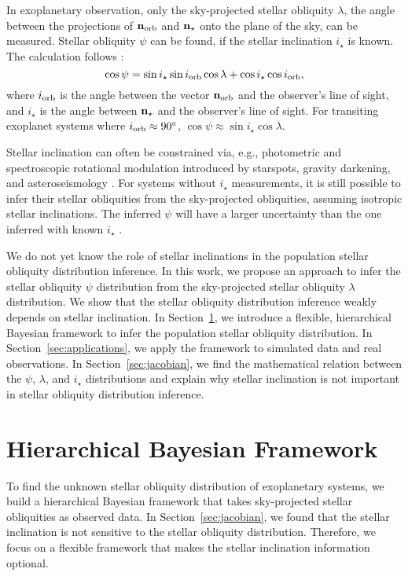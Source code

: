 \documentclass[twocolumn,times]{aastex631}
\begin{document}
In exoplanetary observation, only the sky-projected stellar obliquity $\lambda$, the angle between the projections of $\bf{n}_{\rm orb}$ and $\bf{n}_{\star}$ onto the plane of the sky, can be measured. Stellar obliquity $\psi$ can be found, if the stellar inclination $i_\star$ is known. The calculation follows \citep[e.g.,][]{Fabrycky09}:
\begin{equation}\label{eqn:psi}
    \cos{\psi} = \sin{i_\star}\sin{i_{\rm orb}}\cos{\lambda} + \cos{i_\star}\cos{i_{\rm orb}},
\end{equation}
where $i_{\rm orb}$ is the angle between the vector $\bf{n}_{\rm orb}$ and the observer's line of sight, and $i_\star$ is the angle between $\bf{n}_{\star}$ and the observer's line of sight.
For transiting exoplanet systems where $i_{\rm orb} \approx 90\mbox{$^\circ$}$, $\cos{\psi} \approx \sin{i_\star}\cos{\lambda}$.

Stellar inclination can often be constrained via, e.g., photometric and spectroscopic rotational modulation introduced by starspots, gravity darkening, and asteroseismology \citep[see][and references therein]{Albrecht22}.
For systems without $i_\star$ measurements, it is still possible to infer their stellar obliquities from the sky-projected obliquities, assuming isotropic stellar inclinations. The inferred $\psi$ will have a larger uncertainty than the one inferred with known $i_\star$ \citep{Fabrycky09}.

We do not yet know the role of stellar inclinations in the population stellar obliquity distribution inference. 
In this work, we propose an approach to infer the stellar obliquity $\psi$ distribution from the sky-projected stellar obliquity $\lambda$ distribution. We show that the stellar obliquity distribution inference weakly depends on stellar inclination.
In Section~\ref{sec:hbm}, we introduce a flexible, hierarchical Bayesian framework to infer the population stellar obliquity distribution.
In Section~\ref{sec:applications}, we apply the framework to simulated data and real observations.
In Section~\ref{sec:jacobian}, we find the mathematical relation between the $\psi$, $\lambda$, and $i_\star$ distributions and explain why stellar inclination is not important in stellar obliquity distribution inference.

\section{Hierarchical Bayesian Framework}\label{sec:hbm}

To find the unknown stellar obliquity distribution of exoplanetary systems, we build a hierarchical Bayesian framework that takes sky-projected stellar obliquities as observed data. In Section~\ref{sec:jacobian}, we found that the stellar inclination is not sensitive to the stellar obliquity distribution. Therefore, we focus on a flexible framework that makes the stellar inclination information optional.
\end{document}
